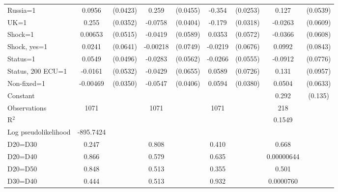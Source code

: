 \begin{tabular}{l|cccccc|cc}
Russia=1        &   0.0956\sym{**} & (0.0423)&    0.259\sym{***}& (0.0455)&   -0.354\sym{***}& (0.0253)&    0.127\sym{**} & (0.0539)\\
UK=1            &    0.255\sym{***}& (0.0352)&  -0.0758\sym{*}  & (0.0404)&   -0.179\sym{***}& (0.0318)&  -0.0263         & (0.0609)\\
Shock=1         &  0.00653         & (0.0515)&  -0.0419         & (0.0589)&   0.0353         & (0.0572)&  -0.0366         & (0.0608)\\
Shock, yes=1    &   0.0241         & (0.0641)& -0.00218         & (0.0749)&  -0.0219         & (0.0676)&   0.0992         & (0.0843)\\
Status=1        &   0.0549         & (0.0496)&  -0.0283         & (0.0562)&  -0.0266         & (0.0555)&  -0.0912         & (0.0776)\\
Status, 200 ECU=1&  -0.0161         & (0.0532)&  -0.0429         & (0.0655)&   0.0589         & (0.0726)&    0.131         & (0.0957)\\
Non-fixed=1     & -0.00469         & (0.0350)&  -0.0547         & (0.0406)&   0.0594         & (0.0380)&   0.0504         & (0.0633)\\
Constant        &                  &         &                  &         &                  &         &    0.292\sym{**} &  (0.135)\\
\hline
Observations    &     1071         &         &     1071         &         &     1071         &         &      218         &         \\
R$^2$       &                  &         &                  &         &                  &         &      0.1549    &   \\ 
Log pseudolikelihood  & -895.7424   &         &                  &         &                  &         &           &   \\ 
D20=D30         &    0.247         &         &    0.808         &         &    0.410         &         &    0.668         &         \\
D20=D40         &    0.866         &         &    0.579         &         &    0.635         &         &0.00000644         &         \\
D20=D50         &    0.848         &         &    0.513         &         &    0.355         &         &    0.501         &         \\
D30=D40         &    0.444         &         &    0.513         &         &    0.932         &         &0.0000760         &         \\

\end{tabular}
